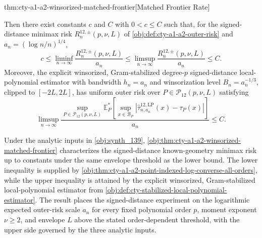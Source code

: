 \begin{theoremv}{thm:cty-a1-a2-winsorized-matched-frontier}[Matched Frontier Rate]
\begin{itemize}
\end{itemize}
Then there exist constants \(c\) and \(C\) with \(0<c\leq C\) such that, for the signed-distance minimax risk \(R^{12,\pm}_n(p,\nu,L)\) of \cref{obj:def:cty-a1-a2-outer-risk} and \(a_n=(\log n/n)^{1/4}\),
\[
c
\leq
\liminf_{n\to\infty}\frac{R^{12,\pm}_n(p,\nu,L)}{a_n}
\leq
\limsup_{n\to\infty}\frac{R^{12,\pm}_n(p,\nu,L)}{a_n}
\leq C .
\]
Moreover, the explicit winsorized, Gram-stabilized degree-\(p\) signed-distance local-polynomial estimator with bandwidth \(h_n=a_n\) and winsorization level \(B_n=a_n^{-1/3}\), clipped to \([-2L,2L]\), has uniform outer risk over \(P\in\mathcal P_{12}(p,\nu,L)\) satisfying
\[
\limsup_{n\to\infty}
\frac{
\sup_{P\in\mathcal P_{12}(p,\nu,L)}
\mathbb E_P^*\!\left[
\sup_{x\in\mathcal B_P}
\left|\widehat\tau^{12,\mathrm{LP}}_{n,a_n}(x)-\tau_P(x)\right|
\right]
}{a_n}
\leq C .
\]
\end{theoremv}

Under the analytic inputs in \cref{obj:synth_139}, \cref{obj:thm:cty-a1-a2-winsorized-matched-frontier} characterizes the signed-distance known-geometry minimax risk up to constants under the same envelope threshold as the lower bound. The lower inequality is supplied by \cref{obj:thm:cty-a1-a2-point-indexed-log-converse-all-orders}, while the upper inequality is attained by the explicit winsorized, Gram-stabilized local-polynomial estimator from \cref{obj:def:cty-stabilized-local-polynomial-estimator}. The result places the signed-distance experiment on the logarithmic expected outer-risk scale \(a_n\) for every fixed polynomial order \(p\), moment exponent \(\nu\ge2\), and envelope \(L\) above the stated order-dependent threshold, with the upper side governed by the three analytic inputs.

